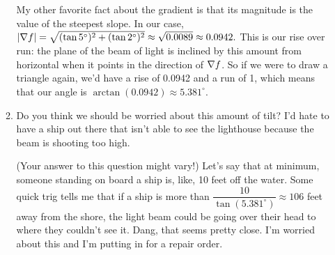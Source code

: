 \begin{enumerate}[leftmargin=0pt]
\begin{enumerate}
        \begin{red}
        My other favorite fact about the gradient is that its magnitude is the value of the steepest slope. In our case, $|\nabla f| = \sqrt{(\tan 5^\circ)^2 + (\tan 2^\circ)^2} \approx \sqrt{0.0089} \approx 0.0942.$ This is our rise over run: the plane of the beam of light is inclined by this amount from horizontal when it points in the direction of $\nabla f$. So if we were to draw a triangle again, we'd have a rise of 0.0942 and a run of 1, which means that our angle is $\arctan(0.0942) \approx 5.381^\circ.$
        \end{red}
        \item Do you think we should be worried about this amount of tilt? I'd hate to have a ship out there that isn't able to see the lighthouse because the beam is shooting too high.
        
        \begin{red}
        (Your answer to this question might vary!) Let's say that at minimum, someone standing on board a ship is, like, 10 feet off the water. Some quick trig tells me that if a ship is more than $\dfrac{10}{\tan(5.381^\circ)} \approx 106$ feet away from the shore, the light beam could be going over their head to where they couldn't see it. Dang, that seems pretty close. I'm worried about this and I'm putting in for a repair order.
        \end{red}
    \end{enumerate}
    
    \end{enumerate}

